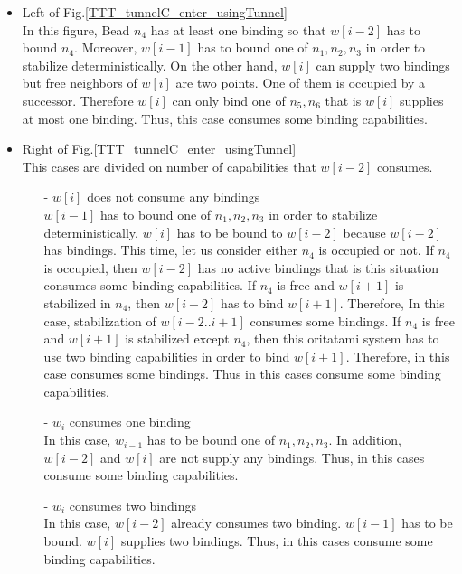 \documentclass[runningheads]{llncs}
\begin{document}
\begin{itemize}
\item{Left of Fig.\ref{TTT_tunnelC_enter_usingTunnel}}\\
  In this figure, Bead $n_4$ has at least one binding so that $w[i-2]$ has to bound $n_4$. Moreover, $w[i-1]$ has to bound one of $n_1, n_2, n_3$ in order to stabilize deterministically. On the other hand, $w[i]$ can supply two bindings but free neighbors of $w[i]$ are two points. One of them is occupied by a successor. Therefore $w[i]$ can only bind one of $n_5, n_6$ that is $w[i]$ supplies at most one binding. Thus, this case consumes some binding capabilities.

\item{Right of Fig.\ref{TTT_tunnelC_enter_usingTunnel}}\\
  This cases are divided on number of capabilities that $w[i-2]$ consumes.
  \begin{itemize}
  \item[-]{$w[i]$ does not consume any bindings}\\
    $w[i-1]$ has to bound one of $n_1, n_2, n_3$ in order to stabilize deterministically. $w[i]$ has to be bound to $w[i-2]$ because $w[i-2]$ has bindings. This time, let us consider either $n_4$ is occupied or not. If $n_4$ is occupied, then $w[i-2]$ has no active bindings that is this situation consumes some binding capabilities. If $n_4$ is free and $w[i+1]$ is stabilized in $n_4$, then $w[i-2]$ has to bind $w[i+1]$. Therefore, In this case, stabilization of $w[i-2..i+1]$ consumes some bindings. If $n_4$ is free and $w[i+1]$ is stabilized except $n_4$, then this oritatami system has to use two binding capabilities in order to bind $w[i+1]$. Therefore, in this case consumes some bindings. Thus in this cases consume some binding capabilities.

  \item[-]{$w_i$ consumes one binding}\\
    In this case, $w_{i-1}$ has to be bound one of $n_1, n_2, n_3$. In addition, $w[i-2]$ and $w[i]$ are not supply any bindings. Thus, in this cases consume some binding capabilities.
  \item[-]{$w_i$ consumes two bindings}\\
    In this case, $w[i-2]$ already consumes two binding. $w[i-1]$ has to be bound. $w[i]$ supplies two bindings. Thus, in this cases consume some binding capabilities.
   
  \end{itemize}
\end{itemize}
\end{document}
